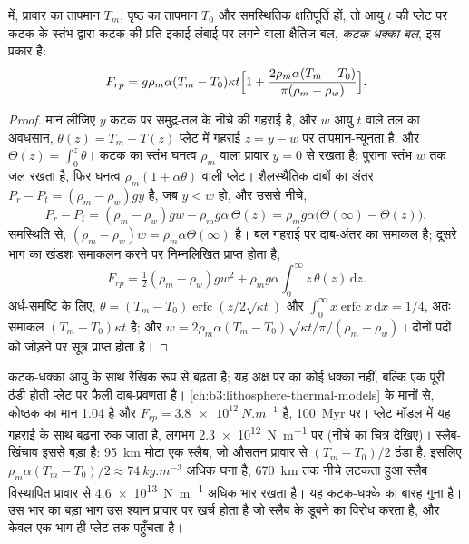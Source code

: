 \begin{proposition}[कटक-धक्का बल]\label{prop:b3:mantle-convection:ridge-push}
 में, प्रावार का तापमान $T_m$, पृष्ठ का
तापमान $T_0$ और समस्थितिक क्षतिपूर्ति हों, तो आयु $t$ की प्लेट पर कटक के स्तंभ
द्वारा कटक की प्रति इकाई लंबाई पर लगने वाला क्षैतिज बल,
\emph{कटक-धक्का बल}, इस प्रकार है:
\[
  F_{rp} = g\rho_m\alpha(T_m - T_0)\kappa t\Bigl[1 + \frac{2\rho_m\alpha(T_m
  - T_0)}{\pi(\rho_m - \rho_w)}\Bigr].
\]
\end{proposition}

\begin{proof}
मान लीजिए $y$ कटक पर समुद्र-तल के नीचे की गहराई है, और $w$ आयु $t$ वाले तल का अवधसान,
$\theta(z) = T_m - T(z)$ प्लेट में गहराई $z = y - w$ पर तापमान-न्यूनता है,
और $\Theta(z) = \int_0^z\theta$।
कटक का स्तंभ घनत्व $\rho_m$ वाला प्रावार $y = 0$ से रखता है; पुराना स्तंभ
$w$ तक जल रखता है, फिर घनत्व $\rho_m(1 + \alpha\theta)$ वाली प्लेट।
शैलस्थैतिक दाबों का अंतर $P_r - P_t = (\rho_m - \rho_w)gy$ है, जब $y < w$ हो,
और उससे नीचे,
\[
  P_r - P_t = (\rho_m - \rho_w)gw - \rho_mg\alpha\,\Theta(z)
  = \rho_mg\alpha\bigl(\Theta(\infty) - \Theta(z)\bigr),
\]
समस्थिति से, $(\rho_m - \rho_w)w = \rho_m\alpha\Theta(\infty)$ है। बल गहराई पर दाब-अंतर का
समाकल है; दूसरे भाग का खंडशः समाकलन करने पर
निम्नलिखित प्राप्त होता है,
\[
  F_{rp} = \tfrac12(\rho_m - \rho_w)gw^2 + \rho_mg\alpha\int_0^\infty
  z\,\theta(z)\,\mathrm dz .
\]
अर्ध-समष्टि के लिए, $\theta = (T_m - T_0)\operatorname{erfc}(z/2\sqrt{\kappa
t})$ और $\int_0^\infty x\operatorname{erfc}x\,\mathrm dx = 1/4$, अतः
समाकल $(T_m - T_0)\kappa t$ है; और $w = 2\rho_m\alpha(T_m -
T_0)\sqrt{\kappa t/\pi}/(\rho_m - \rho_w)$। दोनों पदों को जोड़ने पर
सूत्र प्राप्त होता है।
\end{proof}

कटक-धक्का आयु के साथ रैखिक रूप से बढ़ता है; यह अक्ष पर का कोई धक्का नहीं, बल्कि एक
पूरी ठंडी होती प्लेट पर फैली दाब-प्रवणता है।
\cref{ch:b3:lithosphere-thermal-models} के मानों से, कोष्ठक का मान 1.04 है और $F_{rp} =
\qty{3.8e12}{N.m^{-1}}$ है, \qty{100}{Myr} पर। प्लेट मॉडल में यह
गहराई के साथ बढ़ना रुक जाता है, लगभग \qty{2.3e12}{N.m^{-1}} पर (नीचे का चित्र देखिए)। स्लैब-खिंचाव
इससे बड़ा है: \qty{95}{km} मोटा एक स्लैब, जो औसतन प्रावार से $(T_m - T_0)/2$ ठंडा है,
इसलिए $\rho_m\alpha(T_m - T_0)/2 \approx
\qty{74}{kg.m^{-3}}$ अधिक घना है, \qty{670}{km} तक नीचे लटकता हुआ स्लैब
विस्थापित प्रावार से \qty{4.6e13}{N.m^{-1}} अधिक भार रखता है।
यह कटक-धक्के का बारह गुना है। उस भार का बड़ा भाग उस श्यान प्रावार पर खर्च होता है
जो स्लैब के डूबने का विरोध करता है, और केवल एक भाग ही प्लेट तक पहुँचता है।

